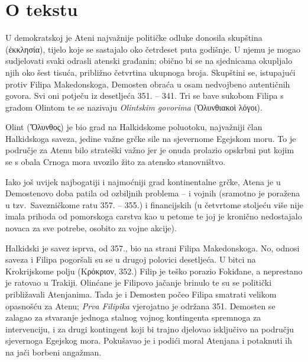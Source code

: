 


\section*{O tekstu}

U demokratskoj je Ateni najvažnije političke odluke donosila skupština \textgreek[variant=ancient]{(ἐκκλησία),} tijelo koje se sastajalo oko četrdeset puta godišnje. U njemu je mogao sudjelovati svaki odrasli atenski građanin; obično bi se na sjednicama okupljalo njih oko šest tisuća, približno četvrtina ukupnoga broja. Skupštini se, istupajući protiv Filipa Makedonskoga, Demosten obraća u osam nedvojbeno autentičnih govora. Svi oni potječu iz desetljeća 351. – 341. Tri se bave sukobom Filipa s gradom Olintom te se nazivaju \textit{Olintskim govorima} \textgreek[variant=ancient]{(Ὀλυνθιακοὶ λόγοι).}

Olint \textgreek[variant=ancient]{(Ὄλυνθος)} je bio grad na Halkidskome poluotoku, najvažniji član Halkidskoga saveza, jedine važne grčke sile na sjevernome Egejskom moru. To je područje za Atenu bilo strateški važno jer je onuda prolazio opskrbni put kojim se s obala Crnoga mora uvozilo žito za atensko stanovništvo. 

Iako još uvijek najbogatiji i najmoćniji grad kontinentalne grčke, Atena je u Demostenovo doba patila od ozbiljnih problema – i vojnih (sramotno je poražena u tzv.\ Savezničkome ratu 357. – 355.) i financijskih (u četvrtome stoljeću više nije imala prihoda od pomorskoga carstva kao u petome te joj je kronično nedostajalo novaca za sve potrebe, osobito za vojne akcije).

Halkidski je savez isprva, od 357., bio na strani Filipa Makedonskoga. No, odnosi saveza i Filipa pogoršali su se u drugoj polovici desetljeća. U bitci na Krokrijskome polju \textgreek[variant=ancient]{(Κρόκριον,} 352.) Filip je teško porazio Fokiđane, a neprestano je ratovao u Trakiji. Olinćane je Filipovo jačanje brinulo te su se politički približavali Atenjanima. Tada je i Demosten počeo Filipa smatrati velikom opasnošću za Atenu; \textit{Prva Filipika} vjerojatno je održana 351. Demosten se zalagao za stvaranje jednoga stalnog vojnog kontingenta spremnoga za intervenciju, i za drugi kontingent koji bi trajno djelovao isključivo na području sjevernoga Egejskog mora. Pokušavao je i podići moral Atenjana i potaknuti ih na jači borbeni angažman.

